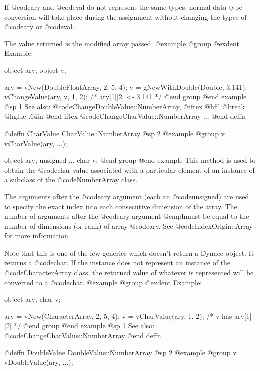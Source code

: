 If @code{ary} and @code{val} do not represent the same types, normal
data type conversion will take place during the assignment without
changing the types of @code{ary} or @code{val}.

The value returned is the modified array passed.
@example
@group
@exdent Example:

object  ary;
object  v;

ary = vNew(DoubleFloatArray, 2, 5, 4);
v = gNewWithDouble(Double, 3.141);
vChangeValue(ary, v, 1, 2);
/*  ary[1][2] <- 3.141  */
@end group
@end example
@sp 1
See also:  @code{ChangeDoubleValue::NumberArray,}
@iftex
@hfil @break @hglue .64in      
@end iftex
@code{ChangeCharValue::NumberArray  ...}
@end deffn












@deffn {CharValue} CharValue::NumberArray
@sp 2
@example
@group
v = vCharValue(ary, ...);

object    ary;
unsigned  ...
char      v;
@end group
@end example
This method is used to obtain the @code{char} value associated with a
particular element of an instance of a subclass of the
@code{NumberArray} class.

The arguments after the @code{ary} argument (each an @code{unsigned})
are used to specify the exact index into each consecutive dimension of
the array.  The number of arguments after the @code{ary} argument
@emph{must} be equal to the number of dimensions (or rank) of array
@code{ary}.  See @code{IndexOrigin::Array} for more information.

Note that this is one of the few generics which doesn't return a Dynace
object.  It returns a @code{char}.  If the instance does not represent
an instance of the @code{CharacterArray} class, the returned value of
whatever is represented will be converted to a @code{char}.
@example
@group
@exdent Example:

object  ary;
char    v;

ary = vNew(CharacterArray, 2, 5, 4);
v = vCharValue(ary, 1, 2);
/*  v has ary[1][2]  */
@end group
@end example
@sp 1
See also:  @code{ChangeCharValue::NumberArray}
@end deffn









@deffn {DoubleValue} DoubleValue::NumberArray
@sp 2
@example
@group
v = vDoubleValue(ary, ...);

